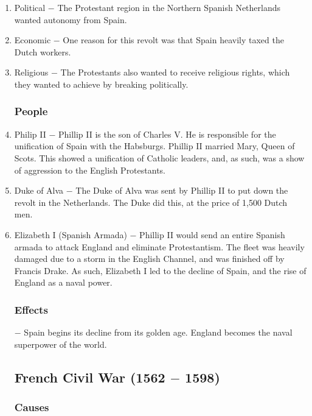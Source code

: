 \documentclass[12pt]{article}
\begin{document}
\begin{enumerate}
\item Political $-$ The Protestant region in the Northern Spanish Netherlands wanted autonomy from Spain.

\item Economic $-$ One reason for this revolt was that Spain heavily taxed the Dutch workers.

\item Religious $-$ The Protestants also wanted to receive religious rights, which they wanted to achieve by breaking politically.

\subsubsection{People}

\item Philip II $-$ Phillip II is the son of Charles V. He is responsible for the unification of Spain with the Habsburgs. Phillip II married Mary, Queen of Scots. This showed a unification of Catholic leaders, and, as such, was a show of aggression to the English Protestants.

\item Duke of Alva $-$ The Duke of Alva was sent by Phillip II to put down the revolt in the Netherlands. The Duke did this, at the price of 1,500 Dutch men.

\item Elizabeth I (Spanish Armada) $-$ Phillip II would send an entire Spanish armada to attack England and eliminate Protestantism. The fleet was heavily damaged due to a storm in the English Channel, and was finished off by Francis Drake. As such, Elizabeth I led to the decline of Spain, and the rise of England as a naval power.

\subsubsection{Effects} $-$ Spain begins its decline from its golden age. England becomes the naval superpower of the world.

\subsection{French Civil War (1562 $-$ 1598)}

\subsubsection{Causes}


\end{enumerate}
\end{document}
